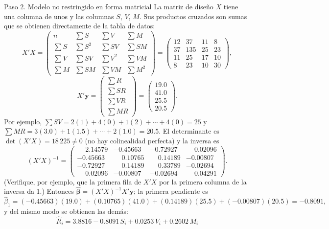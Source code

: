 \documentclass[11pt,letterpaper]{article}
\begin{document}
\begin{paso}{Paso 2. Modelo no restringido en forma matricial}
La matriz de diseño $X$ tiene una columna de unos y las columnas $S$, $V$, $M$. Sus productos cruzados
son sumas que se obtienen directamente de la tabla de datos:
\[
X'X=\begin{pmatrix}
n & \sum S & \sum V & \sum M\\
\sum S & \sum S^2 & \sum SV & \sum SM\\
\sum V & \sum SV & \sum V^2 & \sum VM\\
\sum M & \sum SM & \sum VM & \sum M^2
\end{pmatrix}
=\begin{pmatrix}
12 & 37 & 11 & 8\\
37 & 135 & 25 & 23\\
11 & 25 & 17 & 10\\
8 & 23 & 10 & 30
\end{pmatrix},
\]
\[
X'\mathbf y=\begin{pmatrix}\sum R\\ \sum SR\\ \sum VR\\ \sum MR\end{pmatrix}
=\begin{pmatrix}19.0\\ 41.0\\ 25.5\\ 20.5\end{pmatrix}.
\]
Por ejemplo, $\sum SV=2(1)+4(0)+1(2)+\cdots+4(0)=25$ y $\sum MR=3(3.0)+1(1.5)+\cdots+2(1.0)=20.5$.
El determinante es $\det(X'X)=18\,225\neq0$ (no hay colinealidad perfecta) y la inversa es
\[
(X'X)^{-1}=\begin{pmatrix}
\phantom{-}2.14579 & -0.45663 & -0.72927 & \phantom{-}0.02096\\
-0.45663 & \phantom{-}0.10765 & \phantom{-}0.14189 & -0.00807\\
-0.72927 & \phantom{-}0.14189 & \phantom{-}0.33789 & -0.02694\\
\phantom{-}0.02096 & -0.00807 & -0.02694 & \phantom{-}0.04291
\end{pmatrix}.
\]
(Verifique, por ejemplo, que la primera fila de $X'X$ por la primera columna de la inversa da 1.)
Entonces $\hat{\boldsymbol\beta}=(X'X)^{-1}X'\mathbf y$; la primera pendiente es
\[
\hat\beta_1=(-0.45663)(19.0)+(0.10765)(41.0)+(0.14189)(25.5)+(-0.00807)(20.5)=-0.8091,
\]
y del mismo modo se obtienen las demás:
\[
\boxed{\ \hat R_i=3.8816-0.8091\,S_i+0.0253\,V_i+0.2602\,M_i\ }
\]
\end{paso}
\end{document}
